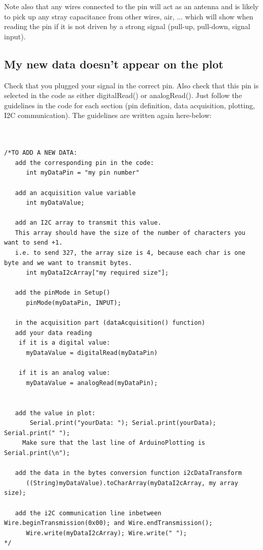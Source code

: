 \documentclass[a4paper]{article}
\begin{document}
Note also that any wires connected to the pin will act as an antenna and is likely to pick up any stray capacitance from other wires, air, ... which will show when reading the pin if it is not driven by a strong signal (pull-up, pull-down, signal input).




\subsection{My new data doesn't appear on the plot}
Check that you plugged your signal in the correct pin. Also check that this pin is selected in the code as either digitalRead() or analogRead(). Just follow the guidelines in the code for each section (pin definition, data acquisition, plotting, I2C communication). The guidelines are written again here-below:

\begin{lstlisting}


/*TO ADD A NEW DATA:
   add the corresponding pin in the code:
      int myDataPin = "my pin number"

   add an acquisition value variable
      int myDataValue;

   add an I2C array to transmit this value.
   This array should have the size of the number of characters you want to send +1.
   i.e. to send 327, the array size is 4, because each char is one byte and we want to transmit bytes.
      int myDataI2cArray["my required size"];

   add the pinMode in Setup()
      pinMode(myDataPin, INPUT);

   in the acquisition part (dataAcquisition() function)
   add your data reading
    if it is a digital value:
      myDataValue = digitalRead(myDataPin)

    if it is an analog value:
      myDataValue = analogRead(myDataPin);


   add the value in plot:
       Serial.print("yourData: "); Serial.print(yourData); Serial.print(" ");
     Make sure that the last line of ArduinoPlotting is Serial.print(\n");

   add the data in the bytes conversion function i2cDataTransform
      ((String)myDataValue).toCharArray(myDataI2cArray, my array size);

   add the i2C communication line inbetween Wire.beginTransmission(0x00); and Wire.endTransmission();
      Wire.write(myDataI2cArray); Wire.write(" ");
*/
\end{lstlisting}
\end{document}
